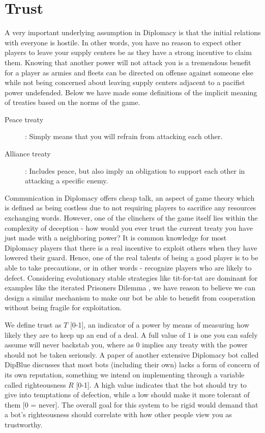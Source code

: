 \documentclass[a4paper]{article} %
\begin{document}
\section{Trust}


A very important underlying assumption in Diplomacy is that the initial relations with everyone is hostile. In other words, you have no reason to expect other players to leave your supply centers be as they have a strong incentive to claim them. Knowing that another power will not attack you is a tremendous benefit for a player as armies and fleets can be directed on offense against someone else while not being concerned about leaving supply centers adjacent to a pacifist power undefended. Below we have made some definitions of the implicit meaning of treaties based on the norms of the game.
\begin{description}
\item[Peace treaty]: Simply means that you will refrain from attacking each other.

\item[Alliance treaty]: Includes peace, but also imply an obligation to support each other in attacking a specific enemy.
\end{description}

Communication in Diplomacy offers cheap talk, an aspect of game theory which is defined as being costless due to not requiring players to sacrifice any resources exchanging words. However, one of the clinchers of the game itself lies within the complexity of deception - how would you ever trust the current treaty you have just made with a neighboring power? It is common knowledge for most Diplomacy players that there is a real incentive to exploit others when they have lowered their guard. Hence, one of the real talents of being a good player is to be able to take precautions, or in other words - recognize players who are likely to defect. Considering evolutionary stable strategies like tit-for-tat are dominant for examples like the iterated Prisoners Dilemma \cite{dilemmas}, we have reason to believe we can design a similar mechanism to make our bot be able to benefit from cooperation without being fragile for exploitation.

We define trust as $T$ [0-1], an indicator of a power by means of measuring how likely they are to keep up an end of a deal. A full value of $1$ is one you can safely assume will never backstab you, where as $0$ implies any treaty with the power should not be taken seriously. A paper of another extensive Diplomacy bot called DipBlue \cite{dipblue} discusses that most bots (including their own) lacks a form of concern of its own reputation, something we intend on implementing through a variable called righteousness $R$ [0-1]. A high value indicates that the bot should try to give into temptations of defection, while a low should make it more tolerant of them [0 = never]. The overall goal for this system to be rigid would demand that a bot's righteousness should correlate with how other people view you as trustworthy.
\end{document}
